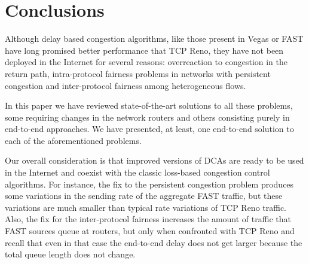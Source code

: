 \documentclass[english,times]{ettauth}
\begin{document}
\section{Conclusions}
\label{sec:conclusions}

Although delay based congestion algorithms, like those present in Vegas or
FAST have long promised better performance that TCP Reno, they have not been
deployed in the Internet for several reasons: overreaction to congestion in
the return path, intra-protocol fairness problems in networks with persistent
congestion and inter-protocol fairness among heterogeneous flows.

In this paper we have reviewed state-of-the-art solutions to all these
problems, some requiring changes in the network routers and others consisting
purely in end-to-end approaches. We have presented, at least, one end-to-end
solution to each of the aforementioned problems.

Our overall consideration is that improved versions of DCAs are ready to be
used in the Internet and coexist with the classic loss-based congestion
control algorithms. For instance, the fix to the persistent congestion problem
produces some variations in the sending rate of the aggregate FAST traffic,
but these variations are much smaller than typical rate variations of TCP Reno
traffic. Also, the fix for the inter-protocol fairness increases the amount of
traffic that FAST sources queue at routers, but only when confronted with TCP
Reno and recall that even in that case the end-to-end delay does not get
larger because the total queue length does not change.




\end{document}
